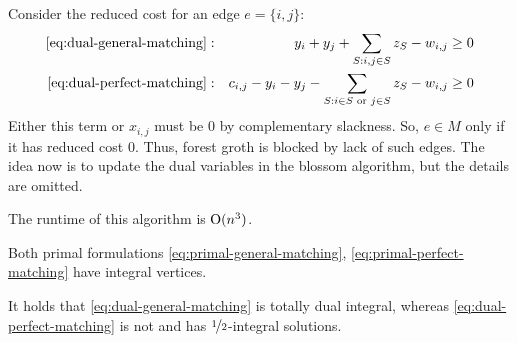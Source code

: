 Consider the reduced cost for an edge $e = \{i,j\}$:
\begin{align*}
    \eqref{eq:dual-general-matching}: &  & y_i + y_j + \sum_{S: i,j \in S}  z_S - w_{i,j}                          & \geq 0 \\
    \eqref{eq:dual-perfect-matching}: &  & c_{i,j} - y_i - y_j - \sum_{S:i\in S \text{ or } j \in S} z_S - w_{i,j} & \geq 0 \\
\end{align*}
Either this term or $x_{i,j}$ must be 0 by complementary slackness.
So, $e \in M$ only if it has reduced cost $0$.
Thus, forest groth is blocked by lack of such edges.
The idea now is to update the dual variables in the blossom algorithm, but the details are omitted.
\begin{theorem}
    The runtime of this algorithm is $\mathrm{O}(n^3)$.
\end{theorem}
\begin{corollary}
    Both primal formulations \eqref{eq:primal-general-matching}, \eqref{eq:primal-perfect-matching} have integral vertices.
\end{corollary}
\begin{theorem}
    It holds that \eqref{eq:dual-general-matching} is totally dual integral, whereas \eqref{eq:dual-perfect-matching} is not and has $\nicefrac{1}{2}$-integral solutions.
\end{theorem}
